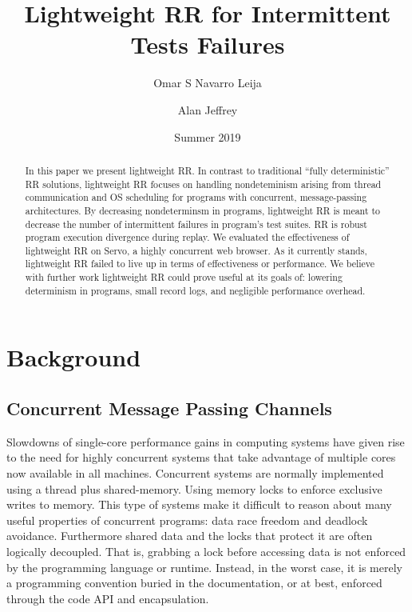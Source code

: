 \documentclass{article}
\begin{document}
\title{Lightweight RR for Intermittent Tests Failures}
\author[1]{Omar S Navarro Leija}
\author[2]{Alan Jeffrey}
\date{Summer 2019}
\maketitle

\begin{abstract}
  In this paper we present lightweight RR. In contrast to traditional ``fully deterministic''
  RR solutions, lightweight RR focuses on handling nondeteminism arising from thread
  communication and OS scheduling for programs with concurrent, message-passing
  architectures. By decreasing nondeterminsm in programs, lightweight RR is meant to
  decrease the number of intermittent failures in program's test suites. RR is
  robust program execution divergence during replay. We evaluated the effectiveness
  of lightweight RR on Servo, a highly concurrent web browser. As it currently stands,
  lightweight RR failed to live up in terms of effectiveness or performance.
  We believe with further work lightweight RR could prove useful at its goals of:
  lowering determinism in programs, small record logs, and negligible performance
  overhead.
\end{abstract}

\section{Background}

\subsection{Concurrent Message Passing Channels}
Slowdowns of single-core performance gains in computing systems have given rise to the need
for highly concurrent systems that take advantage of multiple cores now available
in all machines.
Concurrent systems are normally implemented using a thread plus shared-memory.
Using memory locks to enforce exclusive writes to memory. This type of systems make
it difficult to reason about many useful properties of concurrent programs:
data race freedom and deadlock avoidance.
Furthermore shared data and the locks that protect it are often logically decoupled. That is,
grabbing a lock before accessing data is not enforced by the programming language or runtime.
Instead, in the worst case, it is merely a programming convention buried in the documentation,
or at best, enforced through the code API and encapsulation.
\end{document}
